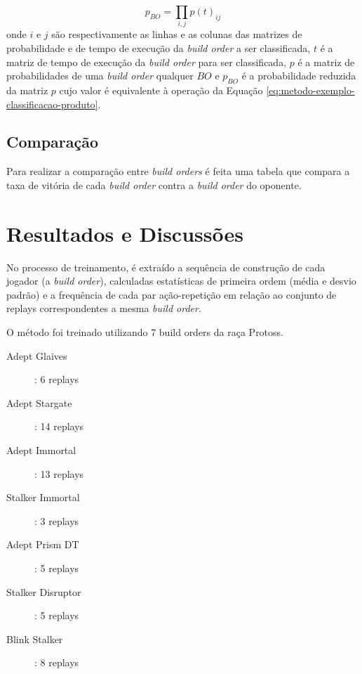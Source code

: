 \begin{equation}
	p_{BO} = \prod_{i,j} p(t)_{ij}
	\label{eq:metodo-matriz-reducao}
\end{equation}
\noindent onde $i$ e $j$ são respectivamente as linhas e as colunas das matrizes de probabilidade e de tempo de execução da \textit{build order} a ser classificada, $t$ é a matriz de tempo de execução da \textit{build order} para ser classificada, $p$ é a matriz de probabilidades de uma \textit{build order} qualquer $BO$ e $p_{BO}$ é a probabilidade reduzida da matriz $p$ cujo valor é equivalente à operação da Equação \ref{eq:metodo-exemplo-classificacao-produto}.

		\section{Comparação}
Para realizar a comparação entre \textit{build orders} é feita uma tabela que compara a taxa de vitória de cada \textit{build order} contra a \textit{build order} do oponente.

	\chapter{Resultados e Discussões}

No processo de treinamento, é extraído a sequência de construção de cada jogador (a \textit{build order}), calculadas estatísticas de primeira ordem (média e desvio padrão) e a frequência de cada par ação-repetição em relação ao conjunto de replays correspondentes a mesma \textit{build order}.

O método foi treinado utilizando 7 build orders da raça Protoss.

\begin{description}
	\item[Adept Glaives]: 6 replays
	\item[Adept Stargate]: 14 replays
	\item[Adept Immortal]: 13 replays
	\item[Stalker Immortal]: 3 replays
	\item[Adept Prism DT]: 5 replays
	\item[Stalker Disruptor]: 5 replays
	\item[Blink Stalker]: 8 replays
\end{description}

